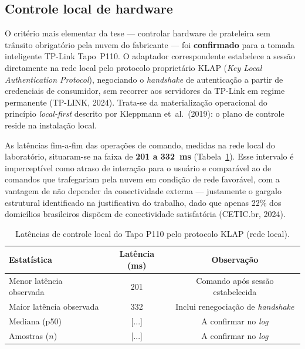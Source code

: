 \subsection{Controle local de hardware}\label{sec:res-controle}

O critério mais elementar da tese --- controlar hardware de prateleira sem trânsito
obrigatório pela nuvem do fabricante --- foi \textbf{confirmado} para a tomada
inteligente TP-Link Tapo~P110. O adaptador correspondente estabelece a sessão
diretamente na rede local pelo protocolo proprietário KLAP (\textit{Key Local
Authentication Protocol}), negociando o \textit{handshake} de autenticação a partir de
credenciais de consumidor, sem recorrer aos servidores da TP-Link em regime permanente
(TP-LINK, 2024). Trata-se da materialização operacional do princípio \textit{local-first}
descrito por Kleppmann et~al.\ (2019): o plano de controle reside na instalação local.

As latências fim-a-fim das operações de comando, medidas na rede local do laboratório,
situaram-se na faixa de \textbf{201 a 332~ms} (Tabela~\ref{tab:latencia-tapo}). Esse
intervalo é imperceptível como atraso de interação para o usuário e comparável ao de
comandos que trafegariam pela nuvem em condição de rede favorável, com a vantagem de
não depender da conectividade externa --- justamente o gargalo estrutural identificado
na justificativa do trabalho, dado que apenas 22\% dos domicílios brasileiros dispõem
de conectividade satisfatória (CETIC.br, 2024).

\begin{table}[H]
\centering
\caption{Latências de controle local do Tapo P110 pelo protocolo KLAP (rede local).}
\label{tab:latencia-tapo}
\begin{tabular}{@{}lcc@{}}
\toprule
\textbf{Estatística} & \textbf{Latência (ms)} & \textbf{Observação} \\
\midrule
Menor latência observada  & 201   & Comando após sessão estabelecida \\
Maior latência observada  & 332   & Inclui renegociação de \textit{handshake} \\
Mediana (p50)             & [...] & A confirmar no \textit{log} \\
Amostras ($n$)            & [...] & A confirmar no \textit{log} \\
\bottomrule
\end{tabular}
\end{table}

